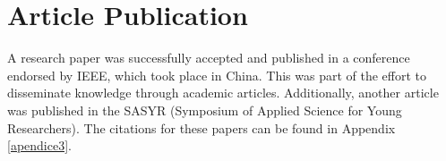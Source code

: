 \section{Article Publication}

A research paper was successfully accepted and published in a conference endorsed by IEEE, which took place in China. This was part of the effort to disseminate knowledge through academic articles. Additionally, another article was published in the SASYR (Symposium of Applied Science for Young Researchers). The citations for these papers can be found in Appendix \ref{apendice3}.
